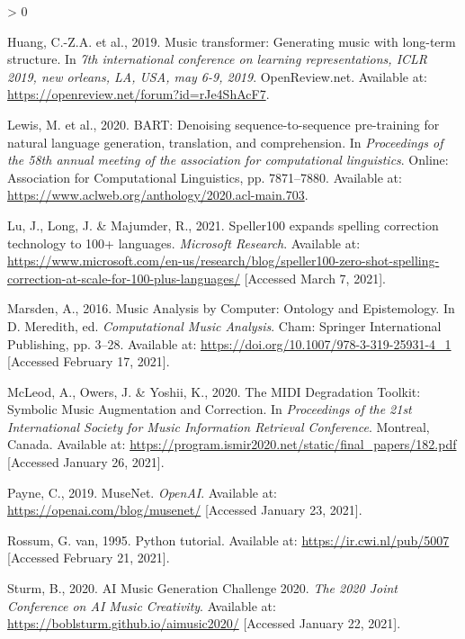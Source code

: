 \documentclass[12pt,a4paper,]{report}
\newlength{\cslhangindent}
\newenvironment{CSLReferences}[2] %
 {%
  \setlength{\parindent}{0pt}
  \ifodd #1 \everypar{\setlength{\hangindent}{\cslhangindent}}\ignorespaces\fi
  \ifnum #2 > 0
  \setlength{\parskip}{#2\baselineskip}
  \fi
 }%
 {}
\begin{document}
\begin{CSLReferences}{1}{0}
\leavevmode\hypertarget{ref-huang_music_2019}{}%
Huang, C.-Z.A. et al., 2019. Music transformer: Generating music with
long-term structure. In \emph{7th international conference on learning
representations, {ICLR} 2019, new orleans, LA, USA, may 6-9, 2019}.
OpenReview.net. Available at:
\url{https://openreview.net/forum?id=rJe4ShAcF7}.

\leavevmode\hypertarget{ref-lewis_bart_2020}{}%
Lewis, M. et al., 2020. {BART}: Denoising sequence-to-sequence
pre-training for natural language generation, translation, and
comprehension. In \emph{Proceedings of the 58th annual meeting of the
association for computational linguistics}. Online: Association for
Computational Linguistics, pp. 7871--7880. Available at:
\url{https://www.aclweb.org/anthology/2020.acl-main.703}.

\leavevmode\hypertarget{ref-lu_speller100_2021}{}%
Lu, J., Long, J. \& Majumder, R., 2021. Speller100 expands spelling
correction technology to 100+ languages. \emph{Microsoft Research}.
Available at:
\url{https://www.microsoft.com/en-us/research/blog/speller100-zero-shot-spelling-correction-at-scale-for-100-plus-languages/}
{[}Accessed March 7, 2021{]}.

\leavevmode\hypertarget{ref-marsden_music_2016}{}%
Marsden, A., 2016. Music {Analysis} by {Computer}: {Ontology} and
{Epistemology}. In D. Meredith, ed. \emph{Computational {Music}
{Analysis}}. Cham: Springer International Publishing, pp. 3--28.
Available at: \url{https://doi.org/10.1007/978-3-319-25931-4_1}
{[}Accessed February 17, 2021{]}.

\leavevmode\hypertarget{ref-mcleod_midi_2020}{}%
McLeod, A., Owers, J. \& Yoshii, K., 2020. The {MIDI} {Degradation}
{Toolkit}: {Symbolic} {Music} {Augmentation} and {Correction}. In
\emph{Proceedings of the 21st {International} {Society} for {Music}
{Information} {Retrieval} {Conference}}. Montreal, Canada. Available at:
\url{https://program.ismir2020.net/static/final_papers/182.pdf}
{[}Accessed January 26, 2021{]}.

\leavevmode\hypertarget{ref-payne_musenet_2019}{}%
Payne, C., 2019. {MuseNet}. \emph{OpenAI}. Available at:
\url{https://openai.com/blog/musenet/} {[}Accessed January 23, 2021{]}.

\leavevmode\hypertarget{ref-van_rossum_python_1995}{}%
Rossum, G. van, 1995. Python tutorial. Available at:
\url{https://ir.cwi.nl/pub/5007} {[}Accessed February 21, 2021{]}.

\leavevmode\hypertarget{ref-sturm_ai_2020}{}%
Sturm, B., 2020. {AI} {Music} {Generation} {Challenge} 2020. \emph{The
2020 Joint Conference on AI Music Creativity}. Available at:
\url{https://boblsturm.github.io/aimusic2020/} {[}Accessed January 22,
2021{]}.


\end{CSLReferences}
\end{document}
